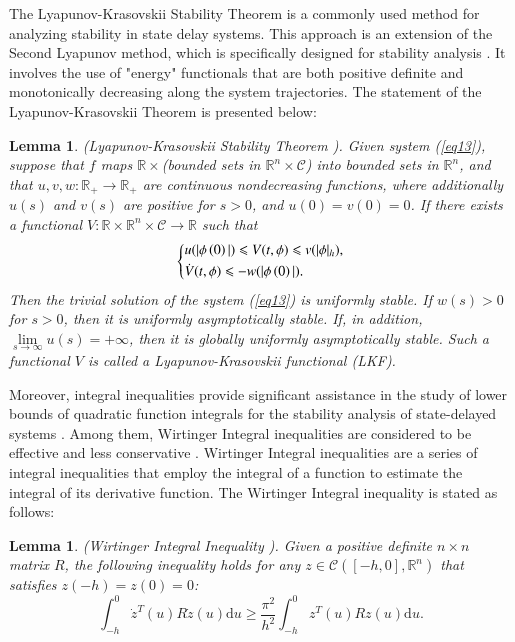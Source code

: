 \documentclass[journal]{IEEEtran}
\newtheorem{lemma}[theorem]{Lemma}
\begin{document}
The Lyapunov-Krasovskii Stability Theorem is a commonly used method for analyzing stability in state delay systems. This approach is an extension of the Second Lyapunov method, which is specifically designed for stability analysis \citep{Gu2003}. It involves the use of "energy" functionals that are both positive definite and monotonically decreasing along the system trajectories. The statement of the Lyapunov-Krasovskii Theorem is presented below:
\begin{lemma}
  \label{lemma3}
  (Lyapunov-Krasovskii Stability Theorem \citep{Gu2009}). Given system (\ref{eq13}), suppose that $f$ maps $\mathbb{R} \times  $(bounded sets in ${\mathbb{R}^n} \times \mathcal{C} $) into bounded sets in ${\mathbb{R}^n} $, and that $u,v,w:{\mathbb{R}_ + } \to {\mathbb{R}_ + } $ are continuous nondecreasing functions, where additionally $u(s) $ and $v(s) $ are positive for $s > 0 $, and $u(0) = v(0) = 0 $. If there exists a functional $V:\mathbb{R} \times {\mathbb{R}^n} \times \mathcal{C} \to \mathbb{R} $ such that
  \begin{equation}
    \left\{ \begin{gathered}
      u(|\phi \left( 0 \right)|) \leqslant V(t,\phi ) \leqslant v(|\phi {|_h}) \hfill, \\
      \dot V(t,\phi ) \leqslant  - w(|\phi \left( 0 \right)|). \hfill \\
    \end{gathered}  \right.
    \label{eq15}
  \end{equation}
  Then the trivial solution of the system (\ref{eq13}) is uniformly stable. If $w(s) > 0 $ for $s > 0 $, then it is uniformly asymptotically stable. If, in addition, $\mathop {\lim }\limits_{s \to \infty } u(s) =  + \infty  $, then it is globally uniformly asymptotically stable. Such a functional $V $ is called a Lyapunov-Krasovskii functional (LKF).
\end{lemma}

Moreover, integral inequalities provide significant assistance in the study of lower bounds of quadratic function integrals for the stability analysis of state-delayed systems \citep{martyniuk_integral_1979,zhang_stability_2016,li_uniform_2021}. Among them, Wirtinger Integral inequalities are considered to be effective and less conservative \citep{saravanan_finite-time_2021,suresh_robust_2021}. Wirtinger Integral inequalities are a series of integral inequalities that employ the integral of a function to estimate the integral of its derivative function. The Wirtinger Integral inequality is stated as follows:
\begin{lemma}
  \label{lemma1}
  (Wirtinger Integral Inequality \citep{park_stability_2015}). Given a positive definite $n \times n$ matrix $R$, the following inequality holds for any $z \in \mathcal{C}\left( {\left[ { - h,0} \right],{\mathbb{R}^n}} \right)$ that satisfies $z(-h) = z(0) = 0$:
  \begin{equation}
    \int_{ - h}^0 {{{\dot z}^T}} (u)R\dot z(u){\text{d}}u \geqslant \frac{{{\pi ^2}}}{{{h^2}}}\int_{ - h}^0 {{z^T}} (u)Rz(u){\text{d}}u.
    \label{eqlemma1}
  \end{equation}
\end{lemma}
\end{document}
